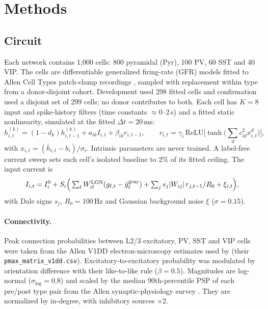 \section{Methods}\label{sec:methods}

\subsection{Circuit}
Each network contains 1{,}000 cells: 800 pyramidal (Pyr), 100 PV, 60 SST and 40 VIP. The cells
are differentiable generalized firing-rate (GFR) models fitted to Allen Cell Types patch-clamp
recordings \citep{yeung2025gfr}, sampled with replacement within type from a donor-disjoint
cohort. Development used 298 fitted cells and confirmation used a disjoint set of 299 cells; no
donor contributes to both. Each cell has $K=8$ input and spike-history filters (time constants
$\approx$0--2\,s) and a fitted static nonlinearity, simulated at the fitted $\Delta t=20$\,ms:
\begin{equation}
h^{(k)}_{i,t}=(1-d_k)h^{(k)}_{i,t-1}+a_{ik}I_{i,t}+\beta_{ik}r_{i,t-1},\qquad
r_{i,t}=\gamma_i\,\mathrm{ReLU}\big[\tanh\big(\textstyle\sum_d c_{id}^2 x_{i,t}^d\big)\big],
\end{equation}
with $x_{i,t}=(\bar h_{i,t}-b_i)/\sigma_i$. Intrinsic parameters are never trained. A label-free
current sweep sets each cell's isolated baseline to 2\% of its fitted ceiling. The input current is
\begin{equation}
I_{i,t}=I^0_i+S_i\Big(\textstyle\sum_\ell W^{\rm LGN}_{i\ell}(g_{\ell,t}-\bar g^{\rm gray}_\ell)
+\sum_j s_j|W_{ij}|\,r_{j,t-1}/R_0+\xi_{i,t}\Big),
\end{equation}
with Dale signs $s_j$, $R_0=100$\,Hz and Gaussian background noise $\xi$ ($\sigma=0.15$).

\paragraph{Connectivity.} Peak connection probabilities between L2/3 excitatory, PV, SST and
VIP cells were taken from the Allen V1DD electron-microscopy estimates used by
\citet{ito2026} (their \texttt{pmax\_matrix\_v1dd.csv}). Excitatory-to-excitatory probability was
modulated by orientation difference with their like-to-like rule ($\beta=0.5$). Magnitudes are
log-normal ($\sigma_{\log}=0.8$) and scaled by the median 90th-percentile PSP of each pre/post type
pair from the Allen synaptic-physiology survey \citep{campagnola2022}. They are normalized by
in-degree, with inhibitory sources ×2.

